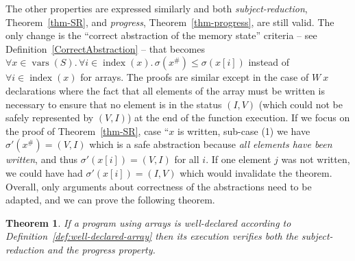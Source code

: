 \documentclass[preprint,12pt]{elsarticle}
\DeclareMathOperator{\vars}{vars}
\newtheorem{Theorem}{Theorem}
\newcommand{\abs}[1]{#1^\#}
\DeclareMathOperator{\range}{index}
\begin{document}
The other properties are expressed similarly and both \emph{subject-reduction}, 
Theorem~\ref{thm-SR}, and \emph{progress}, Theorem~\ref{thm-progress}, are 
still valid. The only change is the ``correct abstraction of the memory state'' criteria -- see Definition~\ref{CorrectAbstraction} --  
that becomes $\forall x\in 
\vars(S).\,\forall i\in\range(x).\, \sigma(\abs x)\leq\sigma(x[i])$ instead of $\forall 
i\in\range(x)$ for arrays. The proofs are similar except in the case of $W~x$ 
declarations where the fact that all elements of the array must be written is necessary 
to ensure that no element is in the status $(I,V)$ (which could not be safely represented 
by $(V,I)$) at the end of the function execution. If we focus on the proof of 
Theorem~\ref{thm-SR}, case ``$x$ is written, sub-case (1) we have $\sigma'(\abs x)=(V,I)$ 
which is a safe abstraction because \emph{all elements have been written}, and thus 
$\sigma'(x[i])=(V,I)$ for all $i$. If one element $j$ was not written, we could have had 
$\sigma'(x[i])=(I,V)$ which would invalidate the theorem. Overall, only arguments about correctness of the abstractions need to be adapted, and we can prove the following theorem.
%
%
\begin{Theorem}\label{thm-correct-array}
If a program using arrays is well-declared according to Definition~\ref{def:well-declared-array} then its execution verifies both the subject-reduction and the progress property.
\end{Theorem}
\end{document}
